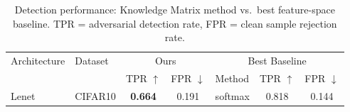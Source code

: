 \begin{table}[t]
\centering
\caption{Detection performance: Knowledge Matrix method vs.\ best feature-space baseline. TPR = adversarial detection rate, FPR = clean sample rejection rate.}
\label{tab:main_results}
\begin{tabular}{ll|cc|lcc}
\toprule
Architecture & Dataset & \multicolumn{2}{c|}{Ours} & \multicolumn{3}{c}{Best Baseline} \\
& & TPR $\uparrow$ & FPR $\downarrow$ & Method & TPR $\uparrow$ & FPR $\downarrow$ \\
\midrule
Lenet & CIFAR10 & \textbf{0.664} & 0.191 & softmax & 0.818 & 0.144 \\
\bottomrule
\end{tabular}
\end{table}
